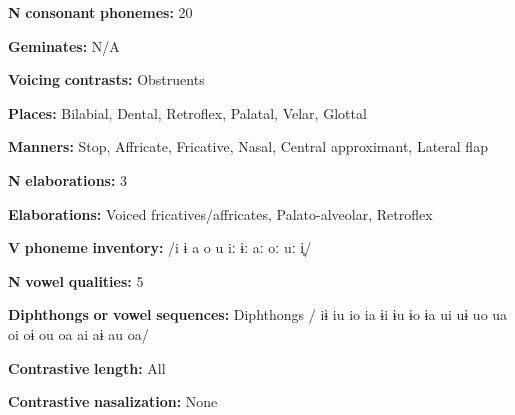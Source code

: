 \begin{styleBody}
\textbf{N} \textbf{consonant} \textbf{phonemes:} 20
\end{styleBody}

\begin{styleBody}
\textbf{Geminates:} N/A
\end{styleBody}

\begin{styleBody}
\textbf{Voicing} \textbf{contrasts:} Obstruents
\end{styleBody}

\begin{styleBody}
\textbf{Places:} Bilabial, Dental, Retroflex, Palatal, Velar, Glottal
\end{styleBody}

\begin{styleBody}
\textbf{Manners:} Stop, Affricate, Fricative, Nasal, Central approximant, Lateral flap
\end{styleBody}

\begin{styleBody}
\textbf{N} \textbf{elaborations:} 3
\end{styleBody}

\begin{styleBody}
\textbf{Elaborations:} Voiced fricatives/affricates, Palato-alveolar, Retroflex
\end{styleBody}

\begin{styleBody}
\textbf{V} \textbf{phoneme} \textbf{inventory:} /i ɨ a o u iː ɨː aː oː uː i̥/
\end{styleBody}

\begin{styleBody}
\textbf{N} \textbf{vowel} \textbf{qualities:} 5
\end{styleBody}

\begin{styleBody}
\textbf{Diphthongs} \textbf{or} \textbf{vowel} \textbf{sequences:} Diphthongs / iɨ iu io ia ɨi ɨu ɨo ɨa ui uɨ uo ua oi oɨ ou oa ai aɨ au oa/
\end{styleBody}

\begin{styleBody}
\textbf{Contrastive} \textbf{length:} All
\end{styleBody}

\begin{styleBody}
\textbf{Contrastive} \textbf{nasalization:} None
\end{styleBody}

